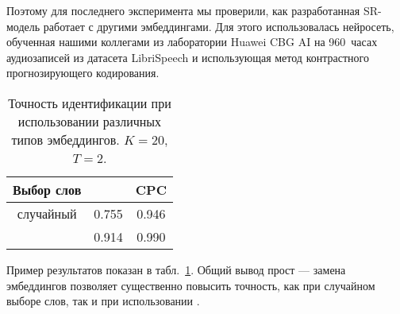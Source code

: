 Поэтому для последнего эксперимента мы проверили, как разработанная SR-модель
работает с другими эмбеддингами. Для этого использовалась нейросеть, обученная
нашими коллегами из лаборатории Huawei CBG AI на 960~часах аудиозаписей из
датасета LibriSpeech\cite{librispeech} и использующая метод контрастного
прогнозирующего кодирования\cite{oord2019representation}.

\begin{table}[htb]
    \centering
    \begin{tabular}{c c c}
        \toprule
        Выбор слов & \xvector{} & CPC\\
        \midrule
        случайный & 0.755 & 0.946\\
        \enquirer{} & 0.914 & 0.990\\
        \bottomrule
    \end{tabular}
    \caption{Точность идентификации при использовании различных типов
    эмбеддингов. $K = 20$, $T = 2$.}
    \label{tab:cpc}
\end{table}

Пример результатов показан в табл.~\ref{tab:cpc}. Общий вывод прост --- замена
эмбеддингов позволяет существенно повысить точность, как при случайном выборе
слов, так и при использовании \enquirer{}.
